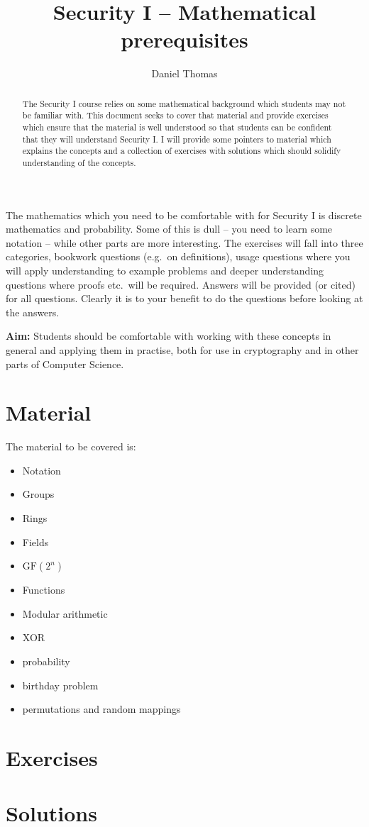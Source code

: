 \documentclass[12pt,a4paper]{article}
\author{Daniel Thomas}
\title{Security I -- Mathematical prerequisites}
\newif\ifshowanswers
\begin{document}
\maketitle

\begin{abstract}
The Security I course relies on some mathematical background which students may not be familiar with.
This document seeks to cover that material and provide exercises which ensure that the material is well understood so that students can be confident that they will understand Security I.
I will provide some pointers to material which explains the concepts and a collection of exercises with solutions which should solidify understanding of the concepts.
\end{abstract}

The mathematics which you need to be comfortable with for Security I is discrete mathematics and probability.
Some of this is dull -- you need to learn some notation -- while other parts are more interesting.
The exercises will fall into three categories, bookwork questions (e.g.\ on definitions), usage questions where you will apply understanding to example problems and deeper understanding questions where proofs etc.\ will be required.
Answers will be provided (or cited) for all questions.
Clearly it is to your benefit to do the questions before looking at the answers.

{\bf Aim:} Students should be comfortable with working with these concepts in general and applying them in practise, both for use in cryptography and in other parts of Computer Science.

\section*{Material}
The material to be covered is:
\begin{itemize}
 \item Notation
 \item Groups
 \item Rings
 \item Fields
 \item $\mathrm{GF}(2^n)$
 \item Functions
 \item Modular arithmetic
 \item XOR
 \item probability
 \item birthday problem
 \item permutations and random mappings
\end{itemize}

\section*{Exercises}
\showanswersfalse


\pagebreak

\section*{Solutions}
\showanswerstrue

\end{document}
